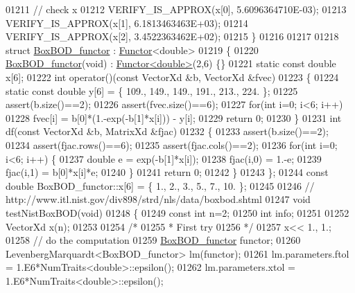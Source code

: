 \begin{DoxyCode}
01211   \textcolor{comment}{// check x}
01212   VERIFY\_IS\_APPROX(x[0], 5.6096364710E-03);
01213   VERIFY\_IS\_APPROX(x[1], 6.1813463463E+03);
01214   VERIFY\_IS\_APPROX(x[2], 3.4522363462E+02);
01215 \}
01216 
01217 
01218 \textcolor{keyword}{struct }\hyperlink{struct_box_b_o_d__functor}{BoxBOD\_functor} : \hyperlink{struct_functor}{Functor}<double>
01219 \{
01220     \hyperlink{struct_box_b_o_d__functor}{BoxBOD\_functor}(\textcolor{keywordtype}{void}) : \hyperlink{struct_functor}{Functor<double>}(2,6) \{\}
01221     \textcolor{keyword}{static} \textcolor{keyword}{const} \textcolor{keywordtype}{double} x[6];
01222     \textcolor{keywordtype}{int} operator()(\textcolor{keyword}{const} VectorXd &b, VectorXd &fvec)
01223     \{
01224         \textcolor{keyword}{static} \textcolor{keyword}{const} \textcolor{keywordtype}{double} y[6] = \{ 109., 149., 149., 191., 213., 224. \};
01225         assert(b.size()==2);
01226         assert(fvec.size()==6);
01227         \textcolor{keywordflow}{for}(\textcolor{keywordtype}{int} i=0; i<6; i++)
01228             fvec[i] =  b[0]*(1.-exp(-b[1]*x[i])) - y[i];
01229         \textcolor{keywordflow}{return} 0;
01230     \}
01231     \textcolor{keywordtype}{int} df(\textcolor{keyword}{const} VectorXd &b, MatrixXd &fjac)
01232     \{
01233         assert(b.size()==2);
01234         assert(fjac.rows()==6);
01235         assert(fjac.cols()==2);
01236         \textcolor{keywordflow}{for}(\textcolor{keywordtype}{int} i=0; i<6; i++) \{
01237             \textcolor{keywordtype}{double} e = exp(-b[1]*x[i]);
01238             fjac(i,0) = 1.-e;
01239             fjac(i,1) = b[0]*x[i]*e;
01240         \}
01241         \textcolor{keywordflow}{return} 0;
01242     \}
01243 \};
01244 \textcolor{keyword}{const} \textcolor{keywordtype}{double} BoxBOD\_functor::x[6] = \{ 1., 2., 3., 5., 7., 10. \};
01245 
01246 \textcolor{comment}{// http://www.itl.nist.gov/div898/strd/nls/data/boxbod.shtml}
01247 \textcolor{keywordtype}{void} testNistBoxBOD(\textcolor{keywordtype}{void})
01248 \{
01249   \textcolor{keyword}{const} \textcolor{keywordtype}{int} n=2;
01250   \textcolor{keywordtype}{int} info;
01251 
01252   VectorXd x(n);
01253 
01254   \textcolor{comment}{/*}
01255 \textcolor{comment}{   * First try}
01256 \textcolor{comment}{   */}
01257   x<< 1., 1.;
01258   \textcolor{comment}{// do the computation}
01259   \hyperlink{struct_box_b_o_d__functor}{BoxBOD\_functor} functor;
01260   LevenbergMarquardt<BoxBOD\_functor> lm(functor);
01261   lm.parameters.ftol = 1.E6*NumTraits<double>::epsilon();
01262   lm.parameters.xtol = 1.E6*NumTraits<double>::epsilon();

\end{DoxyCode}
